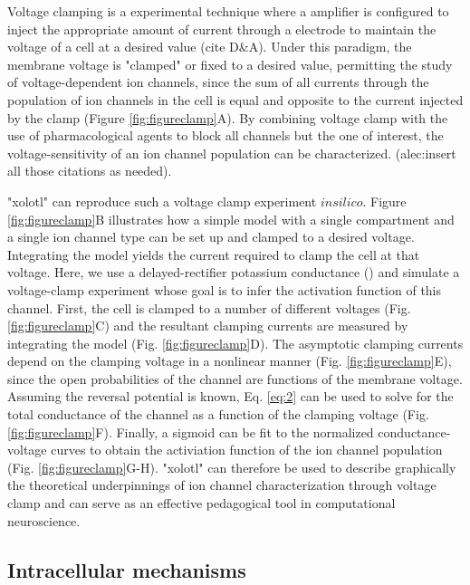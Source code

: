 \documentclass{frontiersSCNS} %
\begin{document}
Voltage clamping is a experimental technique where a amplifier is configured to inject the appropriate amount of current through a electrode to maintain the voltage of a cell at a desired value (cite D\&A). Under this paradigm, the membrane voltage is "clamped" or fixed to a desired value, permitting the study of voltage-dependent ion channels, since the sum of all currents through the population of ion channels in the cell is equal and opposite to the current injected by the clamp (Figure \ref{fig:figureclamp}A). By combining voltage clamp with the use of pharmacological agents to block all channels but the one of interest, the voltage-sensitivity of an ion channel population can be characterized. (alec:insert all those citations as needed). 

"xolotl" can reproduce such a voltage clamp experiment $in silico$. Figure \ref{fig:figureclamp}B illustrates how a simple model with a single compartment and a single ion channel type can be set up and clamped to a desired voltage.  Integrating the model yields the current required to clamp the cell at that voltage. Here, we use a delayed-rectifier potassium conductance (\cite{liuModelNeuronActivitydependent1998}) and simulate a voltage-clamp experiment whose goal is to infer the activation function of this channel. First, the cell is clamped to a number of different voltages (Fig. \ref{fig:figureclamp}C) and the resultant clamping currents are measured by integrating the model (Fig. \ref{fig:figureclamp}D). The asymptotic clamping currents depend on the clamping voltage in a nonlinear manner (Fig. \ref{fig:figureclamp}E), since the open probabilities of the channel are functions of the membrane voltage. Assuming the reversal potential is known, Eq. \eqref{eq:2} can be used to solve for the total conductance of the channel as a function of the clamping voltage (Fig. \ref{fig:figureclamp}F). Finally, a sigmoid can be fit to the normalized conductance-voltage curves to obtain the activiation function of the ion channel population (Fig. \ref{fig:figureclamp}G-H). "xolotl" can therefore be used to describe graphically the theoretical underpinnings of ion channel characterization through voltage clamp and can serve as an effective pedagogical tool in computational neuroscience.

%
%
%
%
%
%



\subsection{Intracellular mechanisms}
\end{document}
